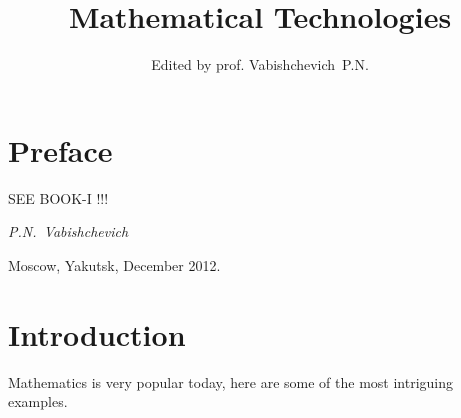 \documentclass[openany]{cspmB}
\begin{document}
\title[Advanced Topics]
{Mathematical Technologies}

\author{Edited by prof. Vabishchevich~P.N.}


\maketitle 


\renewcommand{\contentsname}{Contents}
\tableofcontents

\chapter*{Preface} 

SEE BOOK-I !!!

\begin{flushright}
{\it
P.N.~Vabishchevich

Moscow, Yakutsk, December 2012.
}
\end{flushright}

\chapter*{Introduction}

Mathematics is very popular today, here are some of the most intriguing examples.





\end{document}
